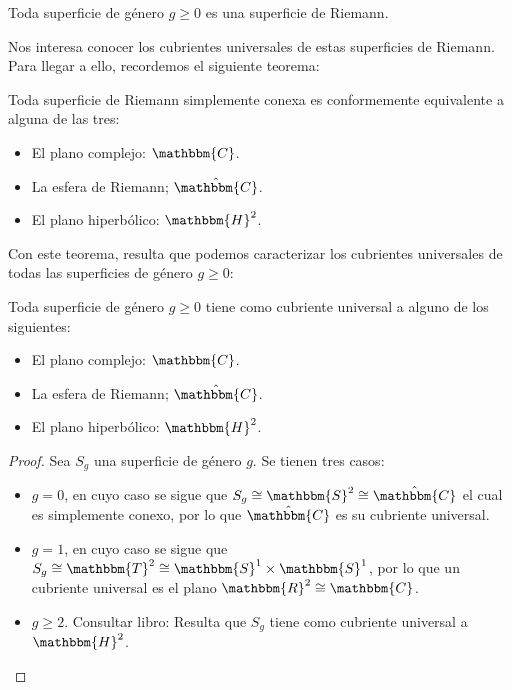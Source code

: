 \documentclass[12pt]{report}
\theoremstyle{largebreak}
\newcommand{\bbm}[1]{\ensuremath{\mathbbm{#1}}}
\begin{document}
    \begin{exa}
        Toda superficie de género $g\geq0$ es una superficie de Riemann. 
    \end{exa}

    Nos interesa conocer los cubrientes universales de estas superficies de Riemann. Para llegar a ello, recordemos el siguiente teorema:

    \begin{theor}
        Toda superficie de Riemann simplemente conexa es conformemente equivalente a alguna de las tres:
        \begin{itemize}
            \item El plano complejo: $\bbm{C}$.
            \item La esfera de Riemann; $\hat{\bbm{C}}$.
            \item El plano hiperbólico: $\bbm{H}^2$.
        \end{itemize}
    \end{theor}

    Con este teorema, resulta que podemos caracterizar los cubrientes universales de todas las superficies de género $g\geq0$:

    \begin{propo}
        Toda superficie de género $g\geq0$ tiene como cubriente universal a alguno de los siguientes:
        \begin{itemize}
            \item El plano complejo: $\bbm{C}$.
            \item La esfera de Riemann; $\hat{\bbm{C}}$.
            \item El plano hiperbólico: $\bbm{H}^2$.
        \end{itemize}
    \end{propo}

    \begin{proof}
        Sea $S_g$ una superficie de género $g$. Se tienen tres casos:
        \begin{itemize}
            \item $g=0$, en cuyo caso se sigue que $S_g\cong\bbm{S}^2\cong\hat{\bbm{C}}$ el cual es simplemente conexo, por lo que $\hat{\bbm{C}}$ es su cubriente universal.
            \item $g=1$, en cuyo caso se sigue que $S_g\cong\bbm{T}^2\cong\bbm{S}^1\times\bbm{S}^1$, por lo que un cubriente universal es el plano $\bbm{R}^2\cong\bbm{C}$.
            \item $g\geq2$. Consultar libro: Resulta que $S_g$ tiene como cubriente universal a $\bbm{H}^2$.
        \end{itemize}
    \end{proof}
\end{document}
